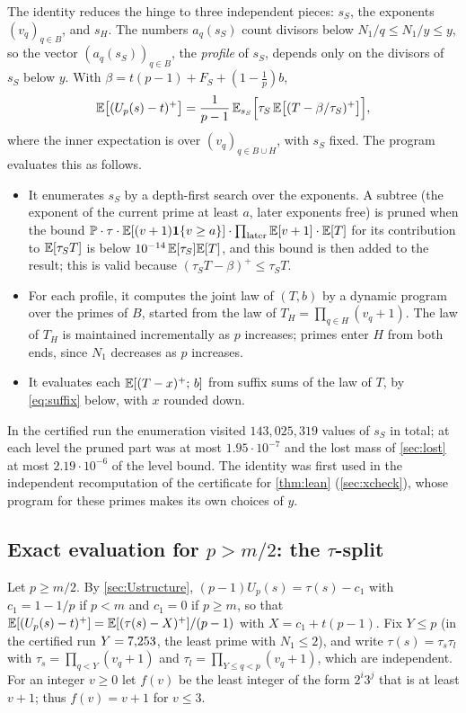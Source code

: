 The identity reduces the hinge to three independent pieces: $s_S$, the exponents $(v_q)_{q\in B}$, and $s_H$. The
numbers $a_q(s_S)$ count divisors below $N_1/q\le N_1/y\le y$, so the vector $(a_q(s_S))_{q\in B}$, the
\emph{profile} of $s_S$, depends only on the divisors of $s_S$ below $y$. With $\beta=t(p-1)+F_S+(1-\frac1p)b$,
\[
  \mathbb{E}\bigl[(U_p(s)-t)^+\bigr]=\frac1{p-1}\,\mathbb{E}_{s_S}\Bigl[\tau_S\,\mathbb{E}\bigl[(T-\beta/\tau_S)^+\bigr]\Bigr],
\]
where the inner expectation is over $(v_q)_{q\in B\cup H}$, with $s_S$ fixed. The program evaluates this as follows.
\begin{itemize}
\item It enumerates $s_S$ by a depth-first search over the exponents. A subtree (the exponent of the current prime
  at least $a$, later exponents free) is pruned when the bound
  $\mathbb{P}\cdot\tau\cdot\mathbb{E}[(v+1)\mathbf{1}\{v\ge a\}]\cdot\prod_{\text{later}}\mathbb{E}[v+1]\cdot\mathbb{E}[T]$ for its contribution to
  $\mathbb{E}[\tau_ST]$ is below $10^{-14}\,\mathbb{E}[\tau_S]\mathbb{E}[T]$, and this bound is then added to the result; this is valid
  because $(\tau_ST-\beta)^+\le\tau_ST$.
\item For each profile, it computes the joint law of $(T,b)$ by a dynamic program over the primes of $B$, started
  from the law of $T_H=\prod_{q\in H}(v_q+1)$. The law of $T_H$ is maintained incrementally as $p$ increases; primes
  enter $H$ from both ends, since $N_1$ decreases as $p$ increases.
\item It evaluates each $\mathbb{E}[(T-x)^+;\,b]$ from suffix sums of the law of $T$, by \eqref{eq:suffix} below, with $x$
  rounded down.
\end{itemize}
In the certified run the enumeration visited $143{,}025{,}319$ values of $s_S$ in total; at each level the pruned
part was at most $1.95\cdot10^{-7}$ and the lost mass of \cref{sec:lost} at most $2.19\cdot10^{-6}$ of the level
bound. The identity was first used in the independent recomputation of the certificate for \cref{thm:lean}
(\cref{sec:xcheck}), whose program for these primes makes its own choices of $y$.

\subsection{Exact evaluation for $p>m/2$: the $\tau$-split}\label{sec:tausplit}

Let $p\ge m/2$. By \cref{sec:Ustructure}, $(p-1)U_p(s)=\tau(s)-c_1$ with $c_1=1-1/p$ if $p<m$ and $c_1=0$ if $p\ge m$,
so that $\mathbb{E}[(U_p(s)-t)^+]=\mathbb{E}[(\tau(s)-X)^+]/(p-1)$ with $X=c_1+t(p-1)$. Fix $Y\le p$ (in the certified run
$Y=7{,}253$, the least prime with $N_1\le2$), and write $\tau(s)=\tau_s\tau_l$ with
$\tau_s=\prod_{q<Y}(v_q+1)$ and $\tau_l=\prod_{Y\le q<p}(v_q+1)$, which are independent. For an integer $v\ge0$ let
$f(v)$ be the least integer of the form $2^i3^j$ that is at least $v+1$; thus $f(v)=v+1$ for $v\le3$.

